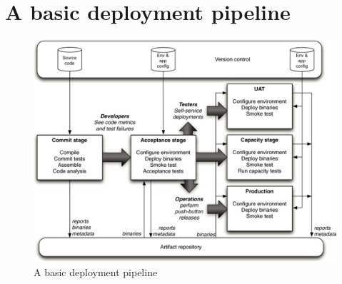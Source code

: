 \documentclass[10pt,article]{IEEEtran}
\begin{document}
%


\appendices
\section{A basic deployment pipeline}
\label{sec:deployment-pipeline}

\begin{figure}[h]
    \centering
    \includegraphics[width=12cm]{deployment-pipeline}
    \caption{A basic deployment pipeline}
    \label{fig:deployment-pipeline}
\end{figure}




\end{document}
